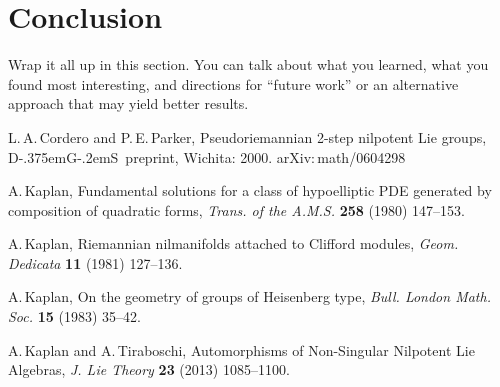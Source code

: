 \documentclass[11 pt]{article}
\newcommand{\DGS}{D{\kern-.375em}G{\kern-.2em}S}
\begin{document}
\section{Conclusion}

Wrap it all up in this section. You can talk about what you learned, what
you found most interesting, and directions for ``future work'' or an alternative
approach that may yield better results.

\begin{thebibliography}{99}
L.\,A.\,Cordero and P.\,E.\,Parker, Pseudoriemannian 2-step
nilpotent Lie groups, \DGS\ preprint, Wichita: 2000.
{\sf arXiv:\,math/0604298}

A.\,Kaplan, Fundamental solutions for a class of hypoelliptic PDE
generated by composition of quadratic forms, {\it Trans. of the A.M.S.} {\bf 258}
(1980) 147--153.

A.\,Kaplan, Riemannian nilmanifolds attached to Clifford modules,
{\it Geom. Dedicata} {\bf 11} (1981) 127--136.

A.\,Kaplan, On the geometry of groups of Heisenberg type, {\it Bull.
London Math. Soc.} {\bf 15} (1983) 35--42.

A.\,Kaplan and A.\,Tiraboschi, Automorphisms of Non-Singular
Nilpotent Lie Algebras, {\it J. Lie Theory} {\bf 23} (2013) 1085--1100.
\end{thebibliography}
\end{document}
